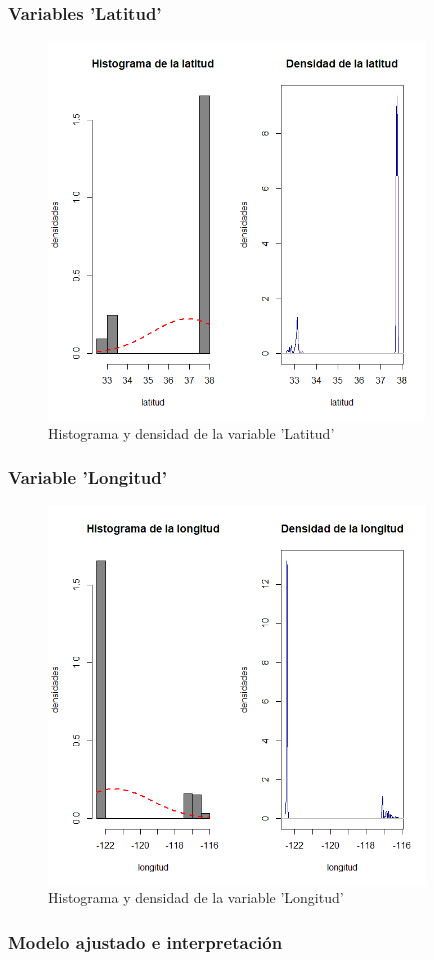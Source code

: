 \documentclass[12pt]{beamer}
\begin{document}
\begin{frame}
\frametitle{Variables 'Latitud'}
\begin{figure}[!h]
    \begin{center}
        \includegraphics[width=10cm]{imagenes/8.png}
        \caption{Histograma y densidad de la variable 'Latitud'}
        \label{fig:Densidad}
    \end{center}
\end{figure}
\end{frame}

\begin{frame}
\frametitle{Variable 'Longitud'}
\begin{figure}[!h]
    \begin{center}
        \includegraphics[width=10cm]{imagenes/9.png}
        \caption{Histograma y densidad de la variable 'Longitud'}
        \label{fig:Densidad}
    \end{center}
\end{figure}
\end{frame}
\begin{frame}
\frametitle{Modelo ajustado e interpretación}
\end{frame}
\end{document}
